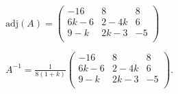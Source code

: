 \begin{prob}
\begin{enumerate}[$a)$]
\begin{myproof}
\begin{multicols}{2}
\begin{table}[H]
\centering
{}
\caption{Cofactores de la tercera fila}
\label{tab:cofactores_fila3}
\end{table}

$\text{adj}(A) = \left( \begin{array}{ccc}
-16&8&8\\
6k-6&2-4k&6\\
9-k&2k-3&-5\\
\end{array} \right)$

$A^{-1} = \frac{1}{8(1+k)} \left( \begin{array}{ccc}
-16&8&8\\
6k-6&2-4k&6\\
9-k&2k-3&-5\\
\end{array} \right).$
\end{multicols}
\end{myproof}
\end{enumerate}
\end{prob}

